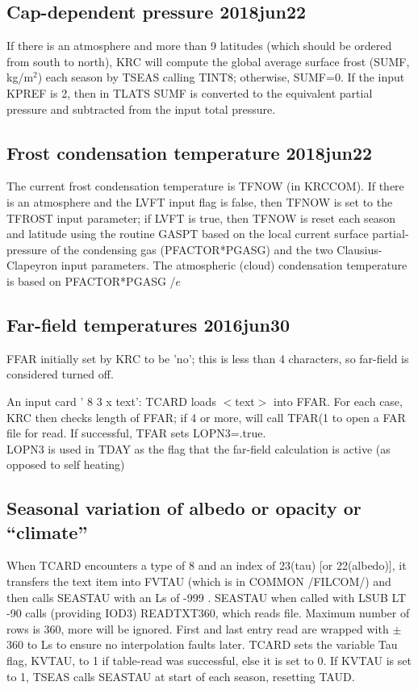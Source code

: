 \documentclass{article}
\begin{document}
\subsection{ Cap-dependent pressure 2018jun22} %
If there is an atmosphere and more than 9 latitudes (which should be ordered
from south to north), KRC will compute the global average surface frost (SUMF,
kg/m$^2$) each season by TSEAS calling TINT8; otherwise, SUMF=0. If the input
KPREF is 2, then in TLATS SUMF is converted to the equivalent partial pressure
and subtracted from the input total pressure.

\subsection{Frost condensation temperature 2018jun22 } 
The current frost condensation temperature is TFNOW (in KRCCOM). If there is an
atmosphere and the LVFT input flag is false, then TFNOW is set to the TFROST
input parameter; if LVFT is true, then TFNOW is reset each season and latitude
using the routine GASPT based on the local current surface partial-pressure of
the condensing gas (PFACTOR*PGASG) and the two Clausius-Clapeyron input
parameters. The atmospheric (cloud) condensation temperature is based on
PFACTOR*PGASG /$e$

\subsection{Far-field temperatures 2016jun30}
FFAR initially set by KRC to be 'no'; this is less than 4 characters, so
far-field is considered turned off.

An input card ' 8 3 x text': TCARD loads $<$text$>$ into FFAR. 
For each case, KRC then checks length of FFAR; if 4 or more, will call TFAR(1 
to open a FAR file for read. If successful, TFAR sets LOPN3=.true. 
\\ LOPN3 is used in TDAY as the flag that the far-field calculation is active
(as opposed to self heating)

\subsection{ Seasonal variation of albedo or opacity or ``climate''}%

When TCARD encounters a type of 8 and an index of 23(tau) [or 22(albedo)], it
transfers the text item into FVTAU (which is in COMMON /FILCOM/) and then calls
SEASTAU with an Ls of -999 .  SEASTAU when called with LSUB LT -90 calls
(providing IOD3) READTXT360, which reads file. Maximum number of rows is 360,
more will be ignored. First and last entry read are wrapped with $\pm$360 to Ls
to ensure no interpolation faults later. TCARD sets the variable Tau flag, KVTAU,
to 1 if table-read was successful, else it is set to 0.
If KVTAU is set to 1, TSEAS calls SEASTAU at start of each season, resetting TAUD. 
\end{document}
